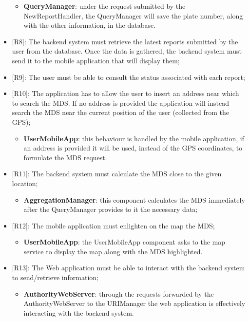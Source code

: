 \begin{itemize}
    \begin{itemize}
      \item \textbf{QueryManager}: under the request submitted by the NewReportHandler, the QueryManager will save the plate number, along with the other information, in the database. 
    \end{itemize} 
    \item {[R8]}: The backend system must retrieve the latest reports submitted by the user from the database. Once the data is gathered, the backend system must send it to the mobile application that will display them; 
    \item {[R9]}: The user must be able to consult the status associated with each report;
    \item {[R10]}: The application has to allow the user to insert an address near which to search the MDS. If no address is provided the application will instead search the MDS near the current position of the user (collected from the GPS);
    \begin{itemize}
      \item \textbf{UserMobileApp}: this behaviour is handled by the mobile application, if an address is provided it will be used, instead of the GPS coordinates, to formulate the MDS request.  
    \end{itemize} 
    \item {[R11]}: The backend system must calculate the MDS close to the given location;
    \begin{itemize}
      \item \textbf{AggregationManager}: this component calculates the MDS immediately after the QueryManager provides to it the necessary data; 
    \end{itemize} 
    \item {[R12]}: The mobile application must enlighten on the map the MDS;
    \begin{itemize}
      \item \textbf{UserMobileApp}: the UserMobileApp component asks to the map service to display the map along with the MDS highlighted.
    \end{itemize} 
    \item {[R13]}: The Web application must be able to interact with the backend system to send/retrieve information;
    \begin{itemize}
      \item \textbf{AuthorityWebServer}: through the requests forwarded by the AuthorityWebServer to the URIManager the web application is effectively interacting with the backend system.

\end{itemize}
\end{itemize}
